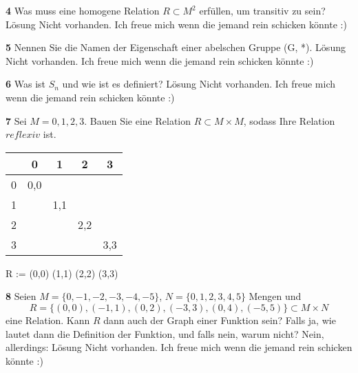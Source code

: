 \documentclass[11pt]{article}
\begin{document}
    \textbf{4} Was muss eine homogene Relation \( R \subset M^2 \) erfüllen, um transitiv zu sein?\newline
    Lösung Nicht vorhanden. Ich freue mich wenn die jemand rein schicken könnte :)\newline

    \textbf{5} Nennen Sie die Namen der Eigenschaft einer abelschen Gruppe (G, *).\newline
    Lösung Nicht vorhanden. Ich freue mich wenn die jemand rein schicken könnte :)\newline

    \textbf{6} Was ist $S_n$ und wie ist es definiert?\newline
    Lösung Nicht vorhanden. Ich freue mich wenn die jemand rein schicken könnte :)\newline

    \textbf{7} Sei $M = {0,1,2,3}$. Bauen Sie eine Relation $R \subset M \times M$, sodass Ihre Relation $reflexiv$ ist.\newline
\begin{tabular}{c|cccc}
    & 0 & 1 & 2 & 3 \\
    \hline
    0 & 0,0 & & & \\
    1 & & 1,1 & & \\
    2 & & & 2,2 & \\
    3 & & & & 3,3 \\
\end{tabular}\newline
R := {(0,0) (1,1) (2,2) (3,3)}\newline


    \textbf{8} Seien \( M = \{0,-1,-2,-3,-4,-5\} \), \( N = \{0,1,2,3,4,5\} \) Mengen und
    \[ R = \{(0,0),(-1,1),(0,2),(-3,3),(0,4),(-5,5)\} \subset M \times N \]
    eine Relation. Kann \( R \) dann auch der Graph einer Funktion sein? Falls ja, wie lautet dann die Definition der Funktion, und falls nein, warum nicht?\newline
    Nein, allerdings:     Lösung Nicht vorhanden. Ich freue mich wenn die jemand rein schicken könnte :)\newline
\end{document}
